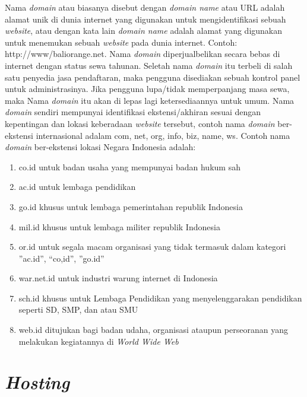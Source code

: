 Nama \textit{domain} atau biasanya disebut dengan \textit{domain name} atau URL adalah alamat unik di dunia internet yang digunakan untuk mengidentifikasi sebuah \textit{website}, atau dengan kata lain \textit{domain name} adalah alamat yang digunakan untuk menemukan sebuah \textit{website} pada dunia internet. Contoh: http://www/baliorange.net. Nama \textit{domain} diperjualbelikan secara bebas di internet dengan status sewa tahunan. Seletah nama \textit{domain} itu terbeli di salah satu penyedia jasa pendaftaran, maka pengguna disediakan sebuah kontrol panel untuk administrasinya. Jika pengguna lupa/tidak memperpanjang masa sewa, maka Nama \textit{domain} itu akan di lepas lagi ketersediaannya untuk umum. Nama \textit{domain} sendiri mempunyai identifikasi ekstensi/akhiran sesuai dengan kepentingan dan lokasi keberadaan \textit{website} tersebut, contoh nama \textit{domain} ber-ekstensi internasional adalam com, net, org, info, biz, name, ws. Contoh nama \textit{domain} ber-ekstensi lokasi Negara Indonesia adalah:

\begin{enumerate}
	\item co.id untuk badan usaha yang mempunyai badan hukum sah
	\item ac.id untuk lembaga pendidikan
	\item go.id khusus untuk lembaga pemerintahan republik Indonesia
	\item mil.id khusus untuk lembaga militer republik Indonesia
	\item or.id untuk segala macam organisasi yang tidak termasuk dalam kategori ”ac.id”, “co,id”, ”go.id”
	\item war.net.id untuk industri warung internet di Indonesia
	\item sch.id khusus untuk Lembaga Pendidikan yang menyelenggarakan pendidikan seperti SD, SMP, dan atau SMU
	\item web.id ditujukan bagi badan udaha, organisasi ataupun perseoranan yang melakukan kegiatannya di\textit{ World Wide Web}
\end{enumerate}

\section{\textit{Hosting}}

